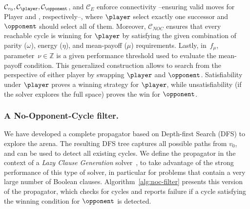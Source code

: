 \documentclass[a4paper,UKenglish,cleveref, autoref, thm-restate, anonymous]{lipics-v2021}
\begin{document}
$\mathcal{C}_{v_0}, \mathcal{C}_{\player}, \mathcal{C}_{\opponent}$, and $\mathcal{C}_{\!E}$ enforce connectivity --ensuring valid moves for Player \even and \odd, respectively--, where $\player$ select exactly one successor and $\opponent$ should select all of them.  
Moreover, $\mathcal{C}_{\!N\!O\!C}$ ensures that every reachable cycle is winning for $\player$ by satisfying the given combination of parity ($\omega$), energy ($\eta$), and mean-payoff ($\mu$) requirements. Lastly, in~$f_\mu$, parameter~$\nu \in \mathbb{Z}$ is a given performance threshold used to evaluate the mean-payoff condition. This generalized construction allows \nocq to search from the perspective of either player by swapping $\player$ and $\opponent$. Satisfiability under $\player$ proves a winning strategy for $\player$, while unsatisfiability (if the solver explores the full space) proves the win for $\opponent$.

\subsubsection{A No-Opponent-Cycle filter.} \label{sec:nocfilter}
We have developed a complete propagator based on Depth-first Search (DFS) to explore the arena. The resulting DFS tree captures all possible paths from $v_0$, and can be used to detect all existing cycles. We define the propagator in the context of a \textit{Lazy Clause Generation} solver~\cite{DBLP:journals/constraints/OhrimenkoSC09}, to take advantage of the strong performance of this type of solver, in particular for problems that contain a very large number of Boolean clauses. Algorithm~\ref{alg:noc-filter} presents this version of the propagator, which checks for cycles and reports failure if a cycle 
satisfying the winning condition for 
$\opponent$ is detected.
\end{document}

